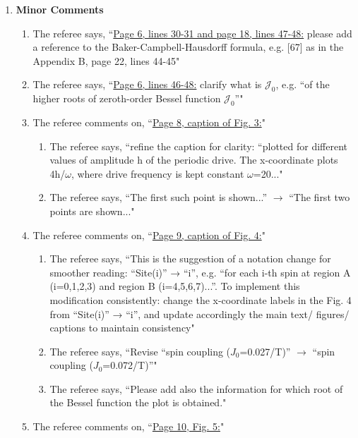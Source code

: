 \documentclass[aps,prb,reprint,showpacs,floatfix,superscriptaddress, onecolumn, nofootinbib, 10pt]{revtex4-2}
\newcommand{\comment}[1]{{\color{blue}#1}} %
\begin{document}
\begin{enumerate}
	\item[] {\bf Minor Comments}
	\begin{enumerate}
		\item The referee says, \comment{``\underline{Page 6, lines 30-31 and page 18, lines 47-48:} please add a reference to the Baker-Campbell-Hausdorff formula, e.g. [67] as in the Appendix B, page 22, lines 44-45"}\\
		\item The referee says, \comment{``\underline{Page 6, lines 46-48:} clarify what is $\mathcal{J}_0$, e.g. “of the higher roots of zeroth-order Bessel function $\mathcal{J}_0$”"}\\
		\item The referee comments on, \comment{``\underline{Page 8, caption of Fig. 3:}"}
		\begin{enumerate}
			\item The referee says, \comment{``refine the caption for clarity: “plotted for different values of amplitude h of the periodic drive. The x-coordinate plots 4h/$\omega$, where drive frequency is kept constant $\omega$=20..."}\\
			\item The referee says, \comment{``The first such point is shown...” $\rightarrow$ “The first two points are shown..."}
		\end{enumerate}
		\item The referee comments on, \comment{``\underline{Page 9, caption of Fig. 4:}"}
		\begin{enumerate}
			\item The referee says, \comment{``This is the suggestion of a notation change for smoother reading: “Site(i)” → “i”, 
			e.g. “for each i-th spin at region A (i=0,1,2,3) and region B (i=4,5,6,7)...”. To implement this modification consistently: change the x-coordinate labels in the Fig. 4 from “Site(i)” → “i”, and update accordingly the main text/ figures/ captions to
			maintain consistency"}\\
			\item The referee says, \comment{``Revise “spin coupling ($J_0$=0.027/T)” $\rightarrow$ “spin coupling ($J_0$=0.072/T)”"}
			\item The referee says, \comment{``Please add also the information for which root of the Bessel function the plot is obtained."}
		\end{enumerate}
		\item The referee comments on, \comment{``\underline{Page 10, Fig. 5:}"}
		\begin{enumerate}

\end{enumerate}
\end{enumerate}
\end{enumerate}
\end{document}
